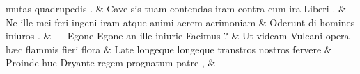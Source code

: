 \documentclass[12pt,onecolumn,twoside,a4paper]{memoir}
\begin{document}
\begin{pairs}
\begin{Leftside}
                              mutas
                              quadrupedis
                              . \&
                         \stanza {}
                     Cave
                              {sis}
                              tuam
                              contendas
                              iram
                              contra
                              cum
                              ira
                              Liberi
                              . \&
                         \stanza {}
                     Ne
                              ille
                              mei
                              feri
                              ingeni
                              iram
                              atque
                              animi
                              acrem
                              acrimoniam \&
                         \stanza {}Oderunt
                              di
                              homines
                              iniuros
                              . & 
                     —
                              Egone
                              {Egone}
                              an
                              ille
                              iniurie
                              Facimus
                              ? \&
                         \stanza {}
                     Ut
                              videam
                              Vulcani
                              opera
                              hæc
                              flammis
                              fieri
                              flora \&
                         \stanza {}
                     Late
                              longeque
                              longeque
                              transtros
                              nostros
                              fervere \&
                         \stanza {}Proinde
                              huc
                              Dryante
                              regem
                              prognatum
                              patre
                              , & 
                     

\end{Leftside}
\end{pairs}
\end{document}
